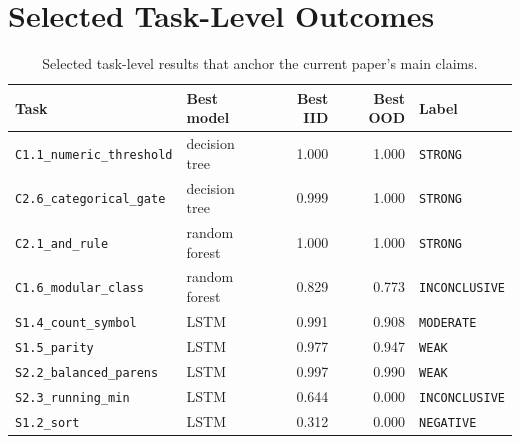 \documentclass[11pt]{article}
\begin{document}
\appendix

\section{Selected Task-Level Outcomes}

\begin{table}[H]
\centering
\caption{Selected task-level results that anchor the current paper's main claims.}
\label{tab:selected}
\begin{tabular}{llrrl}
\toprule
Task & Best model & Best IID & Best OOD & Label \\
\midrule
\texttt{C1.1\_numeric\_threshold} & decision tree & 1.000 & 1.000 & \texttt{STRONG} \\
\texttt{C2.6\_categorical\_gate} & decision tree & 0.999 & 1.000 & \texttt{STRONG} \\
\texttt{C2.1\_and\_rule} & random forest & 1.000 & 1.000 & \texttt{STRONG} \\
\texttt{C1.6\_modular\_class} & random forest & 0.829 & 0.773 & \texttt{INCONCLUSIVE} \\
\texttt{S1.4\_count\_symbol} & LSTM & 0.991 & 0.908 & \texttt{MODERATE} \\
\texttt{S1.5\_parity} & LSTM & 0.977 & 0.947 & \texttt{WEAK} \\
\texttt{S2.2\_balanced\_parens} & LSTM & 0.997 & 0.990 & \texttt{WEAK} \\
\texttt{S2.3\_running\_min} & LSTM & 0.644 & 0.000 & \texttt{INCONCLUSIVE} \\
\texttt{S1.2\_sort} & LSTM & 0.312 & 0.000 & \texttt{NEGATIVE} \\
\bottomrule
\end{tabular}
\end{table}
\end{document}
